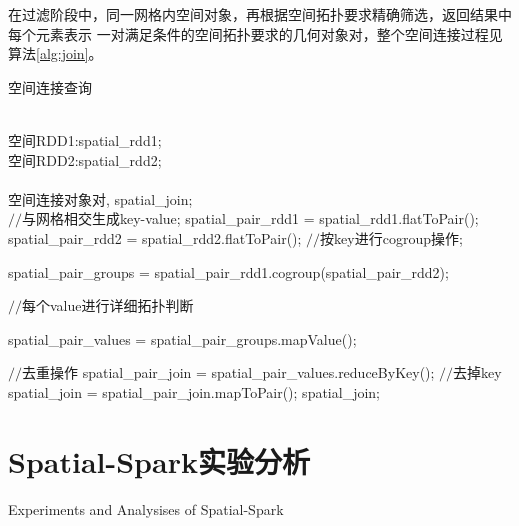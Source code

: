 在过滤阶段中，同一网格内空间对象，再根据空间拓扑要求精确筛选，返回结果中每个元素表示
一对满足条件的空间拓扑要求的几何对象对，整个空间连接过程见算法\ref{alg:join}。
\begin{algorithm}[h]   
\caption{空间连接查询}
\label{alg:join}
\begin{algorithmic}[1] %
\REQUIRE  ~~\\ %
空间RDD1:spatial\_rdd1;\\  
空间RDD2:spatial\_rdd2;\\  
\ENSURE ~~\\ %
空间连接对象对, spatial\_join; \\
\STATE $//$与网格相交生成key-value;
\STATE spatial\_pair\_rdd1 = spatial\_rdd1.flatToPair(); \\ 
       spatial\_pair\_rdd2 = spatial\_rdd2.flatToPair();
\STATE $//$按key进行cogroup操作;

\STATE spatial\_pair\_groups = spatial\_pair\_rdd1.cogroup(spatial\_pair\_rdd2);

\STATE $//$每个value进行详细拓扑判断

\STATE spatial\_pair\_values = spatial\_pair\_groups.mapValue();  

\STATE $//$去重操作 
\STATE spatial\_pair\_join = spatial\_pair\_values.reduceByKey(); 
\STATE $//$去掉key 
\STATE spatial\_join = spatial\_pair\_join.mapToPair(); 
\RETURN spatial\_join; %
\end{algorithmic}  
\end{algorithm} 


\section{Spatial-Spark实验分析}{Experiments and Analysises of Spatial-Spark}

